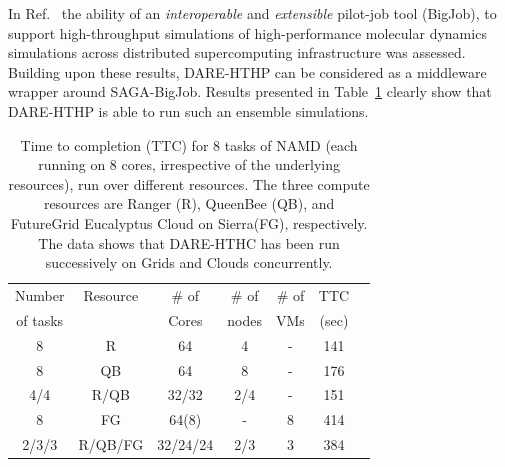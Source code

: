 \documentclass[]{svjour3}
\begin{document}
In Ref.~\cite{bigjob-ccgrid12} the ability of an {\it interoperable}
and {\it extensible} pilot-job tool (BigJob), to support
high-throughput simulations of high-performance molecular dynamics
simulations across distributed supercomputing infrastructure was
assessed.  Building upon these results, DARE-HTHP can be considered as
a middleware wrapper around SAGA-BigJob.  Results presented in
Table~\ref{table:HTHP-Distributed} clearly show that DARE-HTHP is able
to run such an ensemble simulations.




 \begin{table}
\centering
\small
 \begin{tabular}{|c|c|c|c|c|c|c|} 
 \hline 
 Number           & Resource    & \# of &  \# of     &     \# of     &	TTC  \\
of tasks                &     &  Cores    &nodes&   VMs  & (sec) \\  
\hline
8& R&	64	&4 & - &141\\
\hline                  
8& QB	&	64& 8 &	-&176 \\
\hline
4/4&R/QB	&	32/32 &2/4&-&151\\
\hline
8&FG	&	64(8) & - &8&414 \\
\hline
2/3/3&R/QB/FG	&32/24/24&2/3&	3 &384\\
\hline


\end{tabular}
\caption{Time to completion (TTC) for 8 tasks of NAMD (each running on 8 cores,
  irrespective of the underlying resources), run over different resources. The three
  compute resources are Ranger (R), QueenBee (QB), 
  and  FutureGrid  Eucalyptus Cloud on Sierra(FG), respectively. The
  data shows that DARE-HTHC has been run successively on Grids and
  Clouds concurrently.}
 \label{table:HTHP-Distributed} 
\end{table}
\end{document}
